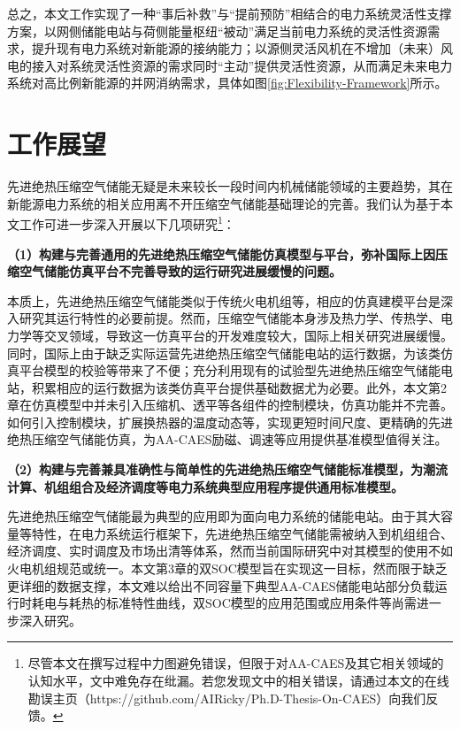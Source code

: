 
总之，本文工作实现了一种“事后补救”与“提前预防”相结合的电力系统灵活性支撑方案，以网侧储能电站与荷侧能量枢纽“被动”满足当前电力系统的灵活性资源需求，提升现有电力系统对新能源的接纳能力；以源侧灵活风机在不增加（未来）风电的接入对系统灵活性资源的需求同时“主动”提供灵活性资源，从而满足未来电力系统对高比例新能源的并网消纳需求，具体如图\ref{fig:Flexibility-Framework}所示。

\section{工作展望}
\label{sec:overlook}
先进绝热压缩空气储能无疑是未来较长一段时间内机械储能领域的主要趋势，其在新能源电力系统的相关应用离不开压缩空气储能基础理论的完善。我们认为基于本文工作可进一步深入开展以下几项研究\footnote{尽管本文在撰写过程中力图避免错误，但限于对AA-CAES及其它相关领域的认知水平，文中难免存在纰漏。若您发现文中的相关错误，请通过本文的在线勘误主页（https://github.com/AIRicky/Ph.D-Thesis-On-CAES）向我们反馈。}：

\textbf{（1）构建与完善通用的先进绝热压缩空气储能仿真模型与平台，弥补国际上因压缩空气储能仿真平台不完善导致的运行研究进展缓慢的问题。}

本质上，先进绝热压缩空气储能类似于传统火电机组等，相应的仿真建模平台是深入研究其运行特性的必要前提。然而，压缩空气储能本身涉及热力学、传热学、电力学等交叉领域，导致这一仿真平台的开发难度较大，国际上相关研究进展缓慢。同时，国际上由于缺乏实际运营先进绝热压缩空气储能电站的运行数据，为该类仿真平台模型的校验等带来了不便；充分利用现有的试验型先进绝热压缩空气储能电站，积累相应的运行数据为该类仿真平台提供基础数据尤为必要。此外，本文第2章在仿真模型中并未引入压缩机、透平等各组件的控制模块，仿真功能并不完善。如何引入控制模块，扩展换热器的温度动态等，实现更短时间尺度、更精确的先进绝热压缩空气储能仿真，为AA-CAES励磁、调速等应用提供基准模型值得关注。


\textbf{（2）构建与完善兼具准确性与简单性的先进绝热压缩空气储能标准模型，为潮流计算、机组组合及经济调度等电力系统典型应用程序提供通用标准模型。}

先进绝热压缩空气储能最为典型的应用即为面向电力系统的储能电站。由于其大容量等特性，在电力系统运行框架下，先进绝热压缩空气储能需被纳入到机组组合、经济调度、实时调度及市场出清等体系，然而当前国际研究中对其模型的使用不如火电机组规范或统一。本文第3章的双SOC模型旨在实现这一目标，然而限于缺乏更详细的数据支撑，本文难以给出不同容量下典型AA-CAES储能电站部分负载运行时耗电与耗热的标准特性曲线，双SOC模型的应用范围或应用条件等尚需进一步深入研究。


